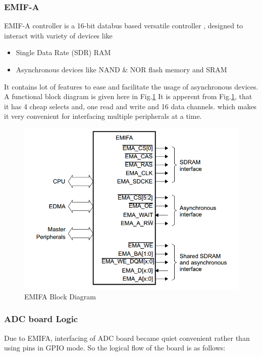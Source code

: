\subsubsection{EMIF-A}
EMIF-A controller is a 16-bit databus based versatile controller \cite{uguide:emifa}, designed to interact with variety of devices like 
\begin{itemize}
\item Single Data Rate (SDR) RAM
\item Asynchronous devices like NAND \& NOR flash memory and SRAM
\end{itemize}
It contains lot of features to ease and facilitate the usage of asynchronous devices. A functional block diagram is given here in Fig.\ref{fig:EMIFA} 
It is apperent from Fig.\ref{fig:EMIFA}, that it has 4 cheap selects and, one read and write and 16 data channels. which makes it very convenient for interfacing multiple peripherals at a time. 
\begin{figure}[ht]
\includegraphics[width=\columnwidth]{fig/EMIFA.png}
\caption{EMIFA Block Diagram \cite{uguide:emifa} }
\label{fig:EMIFA}
\end{figure}

\subsubsection{ADC board Logic}
Due to EMIFA, interfacing of ADC board became quiet convenient rather than using pins in GPIO mode. So the logical flow of the board is as follows:


